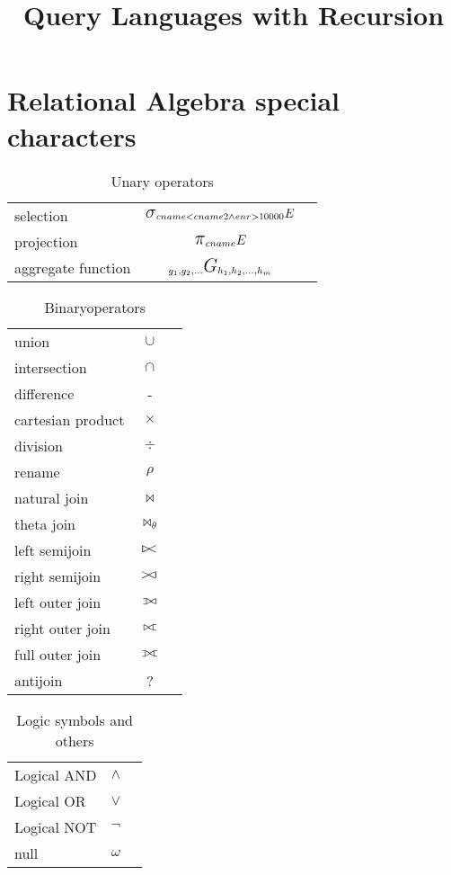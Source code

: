 \documentclass[]{article}
\def\ojoin{\setbox0=\hbox{$\bowtie$}%
  \rule[-.02ex]{.25em}{.4pt}\llap{\rule[\ht0]{.25em}{.4pt}}}
\def\leftouterjoin{\mathbin{\ojoin\mkern-5.8mu\bowtie}}
\def\rightouterjoin{\mathbin{\bowtie\mkern-5.8mu\ojoin}}
\def\fullouterjoin{\mathbin{\ojoin\mkern-5.8mu\bowtie\mkern-5.8mu\ojoin}}
\newcommand{\select}{\mbox{\Large$\sigma$}}
\newcommand{\cross}{\mbox{$\times$}}
\newcommand{\intersection}{\mbox{$\cap$}}
\newcommand{\union}{\mbox{$\cup$}}
\newcommand{\leftsemijoin}{\mbox{$\mathrel{\raise1pt\hbox{\vrule height5pt
depth0pt width0.6pt\hskip-1.5pt$>$\hskip -2.5pt$<$}}$}}
\newcommand{\rightsemijoin}{\mbox{$\mathrel{\raise1pt\hbox{\hskip-1.5pt$>$\hskip -2.5pt$<$\hskip -1.1pt\vrule height5pt
depth0pt width0.6pt}}$}}
\newcommand{\project}{\mbox{\Large$\pi$}}
\newcommand{\aggregatefn}{\mbox{\Large$G$}}
\begin{document}
\title{Query Languages with Recursion}
\maketitle

\begin{center}
\end{center}

\section{Relational Algebra special characters}
\begin{table}[!th]
\begin{tabular}{|l|c|r|}
\hline
selection &  $\select_{cname<cname2 \wedge enr>10000} E$ \\
projection &  $\project_{cname} E$ \\
aggregate function &  $_{g_1,g_2,...} \aggregatefn_{h_1,h_2,...,h_m}$ \\
\hline
\end{tabular}
\caption{Unary operators}
\end{table}

\begin{table}[!th]
\begin{tabular}{|l|c|r|}
\hline
union & 			\union \\
intersection & 		\intersection \\
difference & 		- \\
cartesian product & \cross \\
division & 			$\div$ \\
rename & 			$\rho$ \\
natural join & 		$\bowtie$ \\
theta join & 		$\bowtie_{\theta}$ \\
left semijoin & 	$\leftsemijoin$ \\
right semijoin & 	$\rightsemijoin$ \\ 
left outer join & 	$\leftouterjoin$ \\
right outer join & 	$\rightouterjoin$ \\
full outer join & 	$\fullouterjoin$ \\
antijoin & 			? \\
\hline
\end{tabular}
\caption{Binaryoperators}
\end{table}

\begin{table}[!th]
\begin{tabular}{|l|c|r|}
\hline
Logical AND & 	$\wedge$ \\
Logical OR & 	$\vee$ \\
Logical NOT & 	$\neg$ \\
null & 			$\omega$ \\
\hline
\end{tabular}
\caption{Logic symbols and others}
\end{table}
\end{document}
